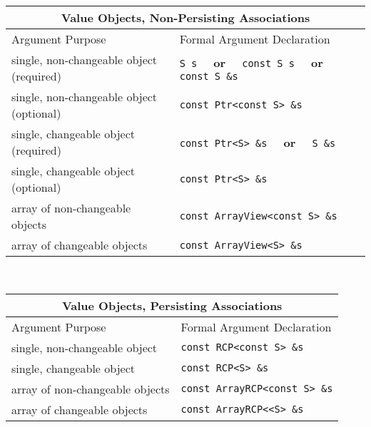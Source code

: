 \begin{tabular}{|l|l|}
%
\multicolumn{2}{c}{\textbf{Value Objects, Non-Persisting Associations}} \\
%
\hline
Argument Purpose
& Formal Argument Declaration \\
\hline
\hline
single, non-changeable object (required)
& {}\texttt{S s} $\;\;\;\;$\textbf{or}$\;\;\;\;$ {}\texttt{const S s} $\;\;\;\;$\textbf{or}$\;\;\;\;$ {}\texttt{const S \&s} \\
\hline
single, non-changeable object (optional)
& {}\texttt{const Ptr<const S> \&s} \\
\hline
single, changeable object (required)
& {}\texttt{const Ptr<S> \&s}  $\;\;\;\;$\textbf{or}$\;\;\;\;$ {}\texttt{S \&s} \\
\hline
single, changeable object (optional)
& \texttt{const Ptr<S> \&s} \\
\hline
array of non-changeable objects
& {}\texttt{const ArrayView<const S> \&s} \\
\hline
array of changeable objects
& {}\texttt{const ArrayView<S> \&s} \\
\hline
%
\end{tabular} \\[3ex]
%
\begin{tabular}{|l|l|}
%
\multicolumn{2}{c}{\textbf{Value Objects, Persisting Associations}} \\
%
\hline
Argument Purpose
& Formal Argument Declaration \\
\hline
\hline
single, non-changeable object
& {}\texttt{const RCP<const S> \&s} \\
\hline
single, changeable object
& {}\texttt{const RCP<S> \&s} \\
\hline
array of non-changeable objects
& {}\texttt{const ArrayRCP<const S> \&s} \\
\hline
array of changeable objects
& {}\texttt{const ArrayRCP<<S> \&s} \\
\hline
\end{tabular}
